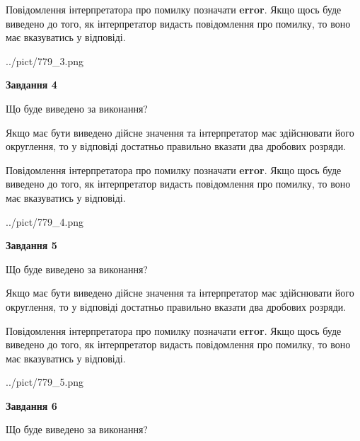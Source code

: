 \documentclass[12pt, ukrainian]{article}
\begin{document}
{\begin {Large}
Повідомлення інтерпретатора про помилку позначати \textbf{error}.
Якщо щось буде виведено до того, як інтерпретатор видасть повідомлення про помилку, 
то воно має вказуватись у відповіді. \par

\begin{center}
	{../pict/779_3.png}
\end{center}
\newpage

{\begin {center}\textbf{Завдання 4}\end {center}}\par
Що буде виведено за виконання? \par

Якщо має бути виведено дійсне значення та інтерпретатор має здійснювати його округлення, 
то у відповіді достатньо правильно вказати два дробових розряди.

Повідомлення інтерпретатора про помилку позначати \textbf{error}.
Якщо щось буде виведено до того, як інтерпретатор видасть повідомлення про помилку, 
то воно має вказуватись у відповіді. \par

\begin{center}
	{../pict/779_4.png}
\end{center}
\newpage

{\begin {center}\textbf{Завдання 5}\end {center}}\par
Що буде виведено за виконання? \par

Якщо має бути виведено дійсне значення та інтерпретатор має здійснювати його округлення, 
то у відповіді достатньо правильно вказати два дробових розряди.

Повідомлення інтерпретатора про помилку позначати \textbf{error}.
Якщо щось буде виведено до того, як інтерпретатор видасть повідомлення про помилку, 
то воно має вказуватись у відповіді. \par

\begin{center}
	{../pict/779_5.png}
\end{center}
\newpage

{\begin {center}\textbf{Завдання 6}\end {center}}\par
Що буде виведено за виконання? \par


\end{Large}}
\end{document}
